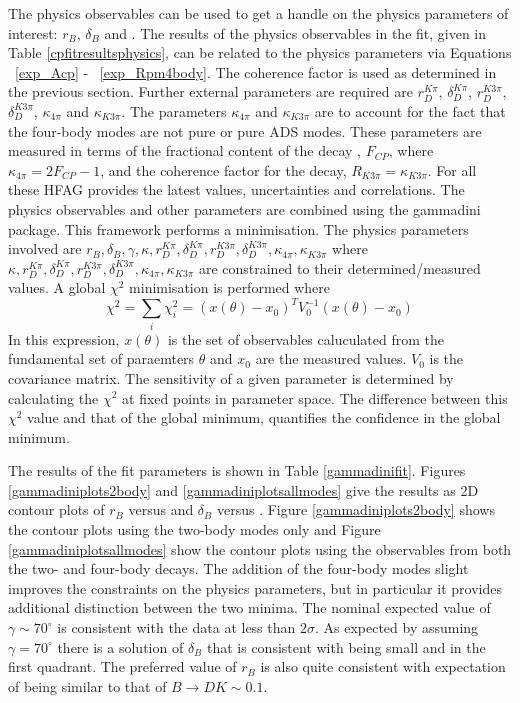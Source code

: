 The physics observables can be used to get a handle on the physics parameters of interest: $r_B$, $\delta_B$ and \Pgamma. 
The results of the physics observables in the \CP fit, given in Table \ref{cpfitresultsphysics}, can be related to the physics parameters via Equations ~\ref{exp_Acp} - ~\ref{exp_Rpm4body}. The coherence factor is used as determined in the previous section. Further external parameters are required are $r_D^{K\pi}$, $\delta_D^{K\pi}$, $r_D^{K3\pi}$, $\delta_D^{K3\pi}$, $\kappa_{4\pi}$ and $\kappa_{K3\pi}$. The parameters $\kappa_{4\pi}$ and $\kappa_{K3\pi}$ are to account for the fact that the four-body modes are not pure \CP or pure ADS modes. These parameters are measured in terms of the fractional \CP content of the decay \decay{\Dz}{\pip\pim\pip\pim}, $F_{CP}$, where $\kappa_{4\pi} = 2F_{CP} - 1$, and the coherence factor for the \decay{\Dz}{\Km\pip\pim\pip} decay, $R_{K3\pi} = \kappa_{K3\pi}$. For all these HFAG provides the latest values, uncertainties and correlations.
The physics observables and other parameters are combined using the gammadini package. This framework performs a minimisation. The physics parameters involved are $r_B, \delta_B, \gamma, \kappa, r_D^{K\pi}, \delta_D^{K\pi}, r_D^{K3\pi}, \delta_D^{K3\pi}, \kappa_{4\pi}, \kappa_{K3\pi}$ where $\kappa, r_D^{K\pi}, \delta_D^{K\pi}, r_D^{K3\pi}, \delta_D^{K3\pi}, \kappa_{4\pi}, \kappa_{K3\pi}$ are constrained to their determined/measured values. 
A global $\chi^2$ minimisation is performed where
\begin{equation}
\chi^2 = \sum_i \chi^2_i = (x(\theta) - x_0)^TV_0^{-1}(x(\theta)-x_0)
\end{equation}
In this expression, $x(\theta)$ is the set of observables caluculated from the fundamental set of paraemters $\theta$ and $x_0$ are the measured values. $V_0$ is the covariance matrix.
The sensitivity of a given parameter is determined by calculating the $\chi^2$ at fixed points in parameter space. The difference between this $\chi^2$ value and that of the global minimum, quantifies the confidence in the global minimum. 

The results of the fit parameters is shown in Table \ref{gammadinifit}. Figures \ref{gammadiniplots2body} and \ref{gammadiniplotsallmodes} give the results as 2D contour plots of $r_B$ versus \Pgamma and $\delta_B$ versus \Pgamma. Figure \ref{gammadiniplots2body} shows the contour plots using the two-body modes only and Figure \ref{gammadiniplotsallmodes} show the contour plots using the observables from both the two- and four-body decays. The addition of the four-body modes slight improves the constraints on the physics parameters, but in particular it provides additional distinction between the two minima. The nominal expected value of $\gamma \sim 70^\circ$ is consistent with the data at less than $2\sigma$. As expected by assuming $\gamma=70^\circ$ there is a solution of $\delta_B$ that is consistent with being small and in the first quadrant. The preferred value of $r_B$ is also quite consistent with expectation of being similar to that of $B \to DK \sim 0.1$.

